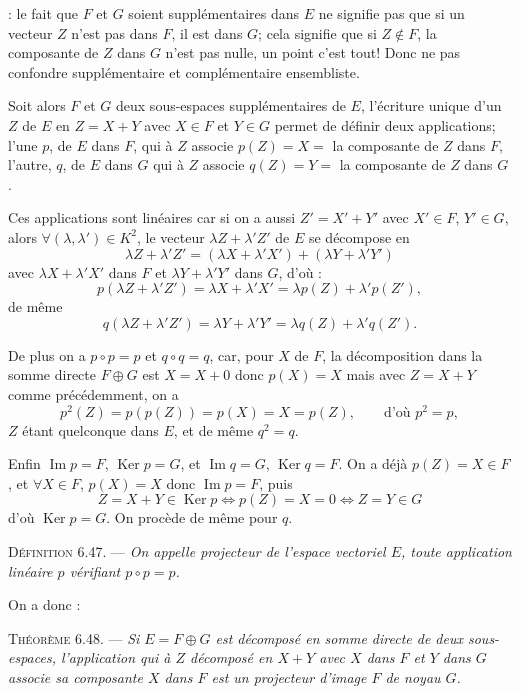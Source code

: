  : le fait que $F$ et $G$ soient supplémentaires dans $E$ ne signifie pas que si un vecteur $Z$ n'est pas dans $F$, il est dans $G$; cela signifie que si $Z\notin F$, la composante de $Z$ dans $G$ n'est pas nulle, un point c'est tout! Donc ne pas confondre supplémentaire et complémentaire ensembliste.

Soit alors $F$ et $G$ deux sous-espaces supplémentaires de $E$, l'écriture unique d'un $Z$ de $E$ en $Z=X+Y$ avec $X\in F$ et $Y\in G$ permet de définir deux applications; l'une $p$, de $E$ dans $F$, qui à $Z$ associe $p(Z)=X=$ la composante de $Z$ dans $F$, l'autre, $q$, de $E$ dans $G$ qui à $Z$ associe $q(Z)=Y=$ la composante de $Z$ dans $G$.

Ces applications sont linéaires car si on a aussi $Z'=X'+Y'$ avec $X'\in F$, $Y'\in G$, alors $\forall(\lambda,\lambda')\in K^2$, le vecteur $\lambda Z+\lambda'Z'$ de $E$ se décompose en
\[
\lambda Z+\lambda'Z'=(\lambda X+\lambda'X')+(\lambda Y+\lambda'Y')
\]
avec $\lambda X+\lambda'X'$ dans $F$ et $\lambda Y+\lambda'Y'$ dans $G$, d'où :
\[
p(\lambda Z+\lambda'Z')=\lambda X+\lambda'X'=\lambda p(Z)+\lambda'p(Z'),
\]
de même
\[
q(\lambda Z+\lambda'Z')=\lambda Y+\lambda'Y'=\lambda q(Z)+\lambda'q(Z').
\]

De plus on a $p\circ p=p$ et $q\circ q=q$, car, pour $X$ de $F$, la décomposition dans la somme directe $F\oplus G$ est $X=X+0$ donc $p(X)=X$ mais avec $Z=X+Y$ comme précédemment, on a
\[
p^2(Z)=p(p(Z))=p(X)=X=p(Z),\qquad\text{d'où }p^2=p,
\]
$Z$ étant quelconque dans $E$, et de même $q^2=q$.

Enfin $\operatorname{Im}p=F$, $\operatorname{Ker}p=G$, et $\operatorname{Im}q=G$, $\operatorname{Ker}q=F$. On a déjà $p(Z)=X\in F$, et $\forall X\in F$, $p(X)=X$ donc $\operatorname{Im}p=F$, puis
\[
Z=X+Y\in\operatorname{Ker}p\Longleftrightarrow p(Z)=X=0\Longleftrightarrow Z=Y\in G
\]
d'où $\operatorname{Ker}p=G$. On procède de même pour $q$.

\medskip\noindent\textsc{Définition 6.47.} --- \emph{On appelle projecteur de l'espace vectoriel $E$, toute application linéaire $p$ vérifiant $p\circ p=p$.}

On a donc :

\medskip\noindent\textsc{Théorème 6.48.} --- \emph{Si $E=F\oplus G$ est décomposé en somme directe de deux sous-espaces, l'application qui à $Z$ décomposé en $X+Y$ avec $X$ dans $F$ et $Y$ dans $G$ associe sa composante $X$ dans $F$ est un projecteur d'image $F$ de noyau $G$.}

